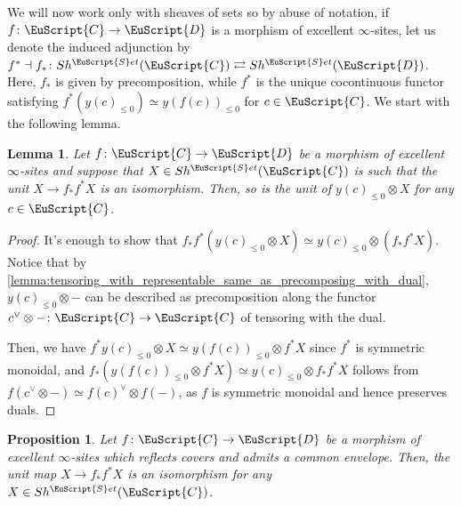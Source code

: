 \documentclass[oneside,a4paper]{amsart}
\newcommand{\euscr}[1]{\EuScript{#1}} %
\newcommand{\ccat}{\euscr{C}} %
\newcommand{\dcat}{\euscr{D}} %
\newcommand{\sets}{\euscr{S}et} %
\theoremstyle{plain}
\newtheorem{lemma}[thm]{Lemma}
\newtheorem{prop}[thm]{Proposition}
\theoremstyle{definition}
\theoremstyle{remark}
\begin{document}
We will now work only with sheaves of sets so by abuse of notation, if $f \colon \ccat \rightarrow \dcat$ is a morphism of excellent $\infty$-sites, let us denote the induced adjunction by $f^{*} \dashv f_{*} \colon Sh^{\sets}(\ccat) \rightleftarrows Sh^{\sets}(\dcat)$. Here, $f_{*}$ is given by precomposition, while $f^{*}$ is the unique cocontinuous functor satisfying $f^{*}(y(c)_{\leq 0}) \simeq y(f(c))_{\leq 0}$ for $c \in \ccat$. We start with the following lemma.

\begin{lemma}
\label{lemma:in_a_morphism_of_excellent_sites_unit_isos_stable_under_tensor_product}
Let $f \colon \ccat \rightarrow \dcat$ be a morphism of excellent $\infty$-sites and suppose that $X \in Sh^{\sets}(\ccat)$ is such that the unit $X \rightarrow f_{*} f^{*} X$ is an isomorphism. Then, so is the unit of $y(c)_{\leq 0} \otimes X$ for any $c \in \ccat$. 
\end{lemma}

\begin{proof}
It's enough to show that $f_{*} f^{*} (y(c)_{\leq 0} \otimes X) \simeq y(c)_{\leq 0} \otimes (f_{*} f^{*} X)$. Notice that by \cref{lemma:tensoring_with_representable_same_as_precomposing_with_dual}, $y(c)_{\leq 0} \otimes -$ can be described as precomposition along the functor $c^{\vee} \otimes - \colon \ccat \rightarrow \ccat$ of tensoring with the dual. 

Then, we have $f^{*} y(c)_{\leq 0} \otimes X \simeq y(f(c))_{\leq 0} \otimes f^{*} X$ since $f^{*}$ is symmetric monoidal, and $f_{*} (y(f(c))_{\leq 0} \otimes f^{*} X) \simeq y(c)_{\leq 0} \otimes f_{*} f^{*} X$ follows from $f(c^{\vee} \otimes -) \simeq f(c)^{\vee} \otimes f(-)$, as $f$ is symmetric monoidal and hence preserves duals. 
\end{proof}

\begin{prop}
\label{prop:the_unit_map_on_sheaves_of_sets_an_isomorphism}
Let $f \colon \ccat \rightarrow \dcat$ be a morphism of excellent $\infty$-sites which reflects covers and admits a common envelope. Then, the unit map $X \rightarrow f_{*} f^{*} X$ is an isomorphism for any $X \in Sh^{\sets}(\ccat)$. 
\end{prop}
\end{document}
